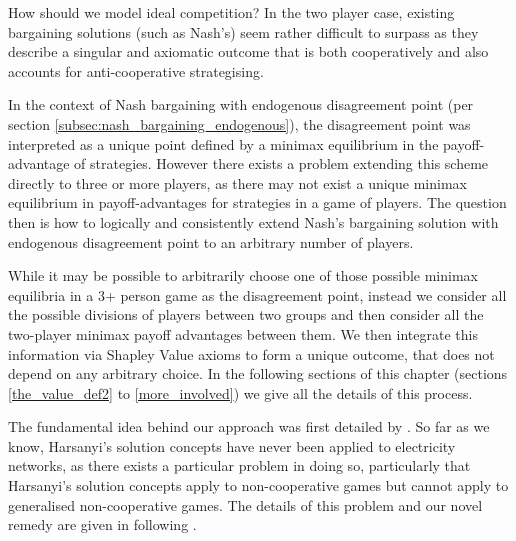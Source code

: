 How should we model ideal competition? In the two player case, existing bargaining solutions (such as Nash's) seem rather difficult to surpass as they describe a singular and axiomatic outcome that is both cooperatively \DIFdelbegin {}\DIFdelend \DIFaddbegin {}\DIFaddend and also accounts for anti-cooperative strategising.

In the context of Nash bargaining with endogenous disagreement point (per section \ref{subsec:nash_bargaining_endogenous}), the disagreement point was interpreted as a unique point defined by a minimax equilibrium in the payoff-advantage of strategies.
However there exists a problem extending this scheme directly to three or more players, as there may not exist a unique minimax equilibrium in payoff-advantages for strategies in a game of \DIFdelbegin {}\DIFdelend \DIFaddbegin {}\DIFaddend players.
The question then is how to logically and consistently extend Nash's bargaining solution with endogenous disagreement point to an arbitrary number of players.

While it may be possible to arbitrarily choose one of those possible minimax equilibria in a 3+ person game as the disagreement point, 
instead we consider all the possible divisions of players between two groups and then consider all the two-player minimax payoff advantages between them. We then integrate this information via Shapley Value axioms to form a unique outcome, that does not depend on any arbitrary choice.
In \DIFaddbegin {}\DIFaddend the following sections of this chapter (sections \ref{the_value_def2} to \ref{more_involved}) we give all the details of this process.%

The fundamental idea behind our approach was first detailed by \cite{values3}.
So far as we know, Harsanyi's solution concepts have never been applied to electricity networks, as there exists a particular problem in doing so, particularly that Harsanyi's solution concepts apply to non-cooperative games but cannot apply to generalised non-cooperative games.
The details of this problem and our novel remedy are given in following \DIFdelbegin {}\DIFdelend \DIFaddbegin {}\DIFaddend .

